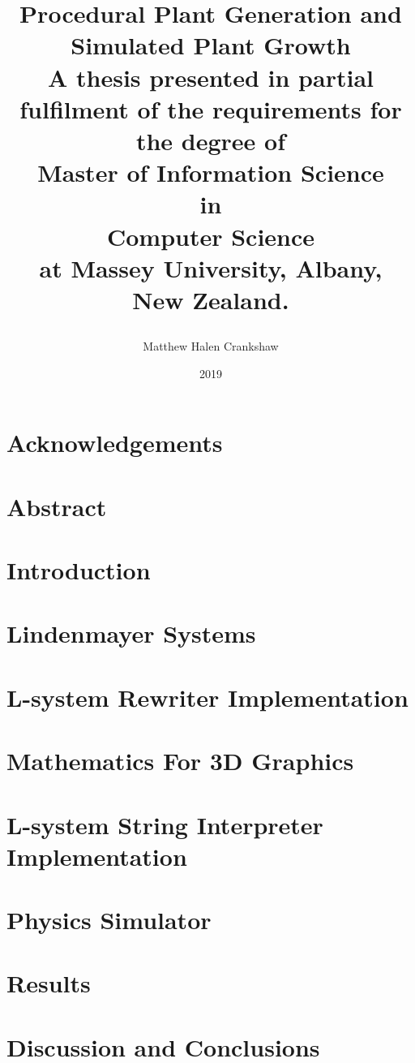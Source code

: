 \documentclass[11pt, twoside]{report}
\title{
{\huge \textbf{Procedural Plant Generation and Simulated Plant Growth }}\\
\vspace{3cm}
{\large A thesis presented in partial fulfilment of the requirements for the degree of \\
\vspace{4cm}
\large \textbf{Master of Information Science}\\
\large \textbf{in}\\
\large \textbf{Computer Science}\\
\vspace{4cm}
\large at Massey University, Albany, \\
\large New Zealand. }
\vspace{3cm}
\author{Matthew Halen Crankshaw}
\date{2019}
}
\begin{document}
\maketitle

\chapter*{Acknowledgements}


\chapter*{Abstract}


\tableofcontents
\listoffigures
\listoftables


\chapter{Introduction}


\chapter{Lindenmayer Systems}  \label{l-system chapter} 


\chapter{L-system Rewriter Implementation} \label{rewriter chapter}


\chapter{Mathematics For 3D Graphics} \label{maths chapter}


\chapter{L-system String Interpreter Implementation} \label{interpreter implementation}


\chapter{Physics Simulator} \label{physics chapter}


\chapter{Results} \label{results chapter}


\chapter{Discussion and Conclusions} \label{discussion chapter}


\printglossary[type=\acronymtype]
\printglossary

\begin{appendices}

\end{appendices}
\end{document}
